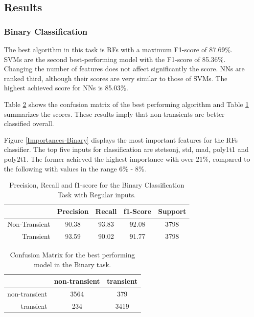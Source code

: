 \documentclass[a4paper,fleqn,usenatbib]{mnras}
\begin{document}
\subsection{Results}

\subsubsection{Binary Classification} 
\label{Results-Binary} 


The best algorithm in this task is RFs with a maximum F1-score of
87.69\%.   
SVMs are the second best-performing model with the F1-score of 85.36\%. 
Changing the number of features does not affect significantly the score.
NNs are ranked third, although their scores are very similar to those of SVMs. 
The highest achieved score for NNs is 85.03\%.


Table \ref{Confusion-Binary} shows the confusion matrix of the best
performing algorithm and Table \ref{Overall-Scores-Binary} summarizes
the scores.
These results imply that non-transients are better classified overall.  


Figure \ref{Importances-Binary} displays the most important features
for the RFs classifier.
The top five inputs for classification are stetson\textunderscore j,
std, mad, poly1\textunderscore t1 and poly2\textunderscore t1.  
The former achieved the highest importance with over 21\%, compared to
the following with values in the range 6\% - 8\%. 


\begin{table}
\centering
\begin{tabular}{|r|c|c|c|c|}
\hline
\multicolumn{1}{|l|}{} & Precision & Recall & f1-Score & Support \\ \hline \hline
Non-Transient          & 90.38    & 93.83   & 92.08   & 3798 \\ \hline
Transient              & 93.59     & 90.02      & 91.77      & 3798    \\ \hline
\end{tabular}
\caption{Precision, Recall and f1-score for the Binary Classification Task with Regular inputs.}
\label{Overall-Scores-Binary}
\end{table}

\begin{table}
\centering
\begin{tabular}{|r|c|c|}
\hline
\multicolumn{1}{|l|}{} & non-transient    & transient   \\ \hline \hline
non-transient                & 3564       & 379    \\ \hline
transient                    & 234       & 3419   \\ \hline
\end{tabular}
\caption{Confusion Matrix for the best performing model in the Binary task.}
\label{Confusion-Binary}
\end{table}
\end{document}
